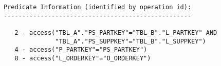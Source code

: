 \documentclass[11pt,a4paper,parskip=half]{scrartcl}
\begin{document}
\begin{lstlisting}
Predicate Information (identified by operation id):                                                                                                                                                                                                                                                          
---------------------------------------------------                                                                                                                                                                                                                                                          
                                                                                                                                                                                                                                                                                                             
   2 - access("TBL_A"."PS_PARTKEY"="TBL_B"."L_PARTKEY" AND                                                                                                                                                                                                                                                   
              "TBL_A"."PS_SUPPKEY"="TBL_B"."L_SUPPKEY")                                                                                                                                                                                                                                                      
   4 - access("P_PARTKEY"="PS_PARTKEY")                                                                                                                                                                                                                                                                      
   8 - access("L_ORDERKEY"="O_ORDERKEY")                                                                                                                                                                                                                                                                     
\end{lstlisting}
\end{document}
